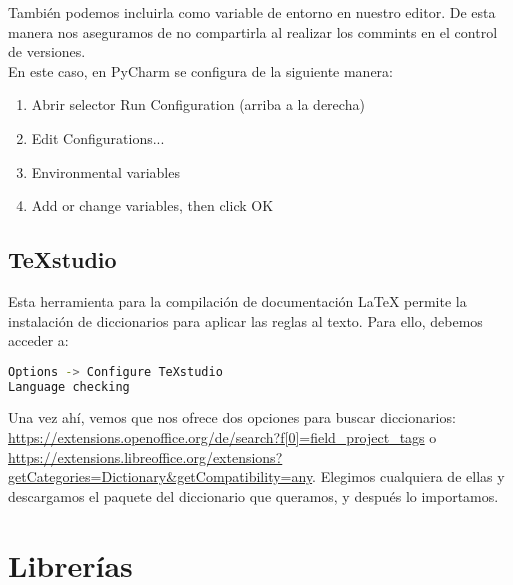 También podemos incluirla como variable de entorno en nuestro editor. De esta manera nos aseguramos de no compartirla al realizar los commints en el control de versiones.
\\
En este caso, en PyCharm se configura de la siguiente manera:
\begin{enumerate}
\item Abrir selector Run Configuration (arriba a la derecha)
\item Edit Configurations...
\item Environmental variables
\item Add or change variables, then click OK 
\end{enumerate}
  
\subsection{\TeX studio}
Esta herramienta para la compilación de documentación \LaTeX{} permite la instalación de diccionarios para aplicar las reglas al texto. Para ello, debemos acceder a:

\renewcommand{\lstlistingname}{Configure \TeX studio}%
\renewcommand{\lstlistlistingname}{List of \lstlistingname s}
\begin{lstlisting}[language=bash,caption={Añadir diccionario}]
Options -> Configure TeXstudio
Language checking
\end{lstlisting}

Una vez ahí, vemos que nos ofrece dos opciones para buscar diccionarios: \url{https://extensions.openoffice.org/de/search?f[0]=field_project_tags} o \url{https://extensions.libreoffice.org/extensions?getCategories=Dictionary&getCompatibility=any}. Elegimos cualquiera de ellas y descargamos el paquete del diccionario que queramos, y después lo importamos.


\section{Librerías}

